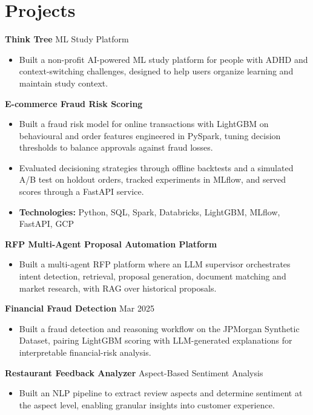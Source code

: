 \documentclass[10pt,a4paper]{article}
\begin{document}
\section{Projects}
\textbf{Think Tree} \textbar{} ML Study Platform\par
\begin{itemize}
  \item Built a non-profit AI-powered ML study platform for people with ADHD and context-switching challenges, designed to help users organize learning and maintain study context.
\end{itemize}
\textbf{E-commerce Fraud Risk Scoring}\par
\begin{itemize}
  \item Built a fraud risk model for online transactions with LightGBM on behavioural and order features engineered in PySpark, tuning decision thresholds to balance approvals against fraud losses.
  \item Evaluated decisioning strategies through offline backtests and a simulated A/B test on holdout orders, tracked experiments in MLflow, and served scores through a FastAPI service.
  \item \textbf{Technologies:} Python, SQL, Spark, Databricks, LightGBM, MLflow, FastAPI, GCP
\end{itemize}
\textbf{RFP Multi-Agent Proposal Automation Platform}\par
\begin{itemize}
  \item Built a multi-agent RFP platform where an LLM supervisor orchestrates intent detection, retrieval, proposal generation, document matching and market research, with RAG over historical proposals.
\end{itemize}
\textbf{Financial Fraud Detection} \textbar{} Mar 2025\par
\begin{itemize}
  \item Built a fraud detection and reasoning workflow on the JPMorgan Synthetic Dataset, pairing LightGBM scoring with LLM-generated explanations for interpretable financial-risk analysis.
\end{itemize}
\textbf{Restaurant Feedback Analyzer} \textbar{} Aspect-Based Sentiment Analysis\par
\begin{itemize}
  \item Built an NLP pipeline to extract review aspects and determine sentiment at the aspect level, enabling granular insights into customer experience.
\end{itemize}
\end{document}
